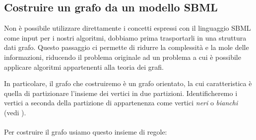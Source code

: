 \subsection{Costruire un grafo da un modello SBML}

Non \`e possibile utilizzare direttamente i concetti espressi con il
linguaggio SBML come input per i nostri algoritmi, dobbiamo prima
trasportarli in una struttura dati grafo. Questo passaggio ci permette
di ridurre la complessit\`a e la mole delle informazioni, riducendo il
problema originale ad un problema a cui \`e possibile applicare
algoritmi appartenenti alla teoria dei grafi.

In particolare, il grafo che costruiremo \`e un grafo orientato, la
cui caratteristica \`e quella di partizionare l'insieme dei vertici in
due partizioni. Identificheremo i vertici a seconda della partizione
di appartenenza come vertici \emph{neri} o \emph{bianchi} (vedi
\cite{tellingStories}).
\\\\
Per costruire il grafo usiamo questo insieme di regole:
